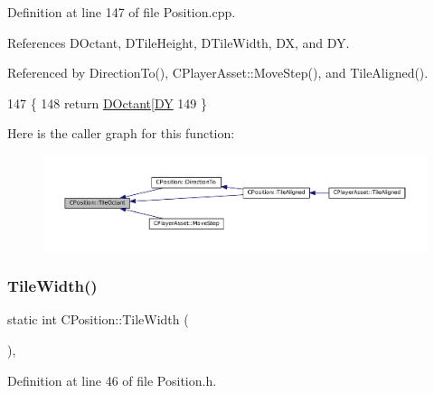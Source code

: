 Definition at line 147 of file Position.\+cpp.



References D\+Octant, D\+Tile\+Height, D\+Tile\+Width, DX, and DY.



Referenced by Direction\+To(), C\+Player\+Asset\+::\+Move\+Step(), and Tile\+Aligned().


\begin{DoxyCode}
147                                       \{
148     \textcolor{keywordflow}{return} \hyperlink{classCPosition_a0f7a420e82a180b983e32258729bb984}{DOctant}[\hyperlink{classCPosition_a84139c9e8eb547e7cf3cb851739943a4}{DY} %
149 \}
\end{DoxyCode}
Here is the caller graph for this function\+:\nopagebreak
\begin{figure}[H]
\begin{center}
\leavevmode
\includegraphics[width=350pt]{classCPosition_a6acbc9445751b0a040c2971720f00088_icgraph}
\end{center}
\end{figure}
\hypertarget{classCPosition_a27a7a8b9a5541da0aa8d97d785650fb8}{}\label{classCPosition_a27a7a8b9a5541da0aa8d97d785650fb8} 
\subsubsection{\texorpdfstring{Tile\+Width()}{TileWidth()}}
{\footnotesize\ttfamily static int C\+Position\+::\+Tile\+Width (\begin{DoxyParamCaption}{ }\end{DoxyParamCaption})\hspace{0.3cm}{\ttfamily [inline]}, {\ttfamily [static]}}



Definition at line 46 of file Position.\+h.



